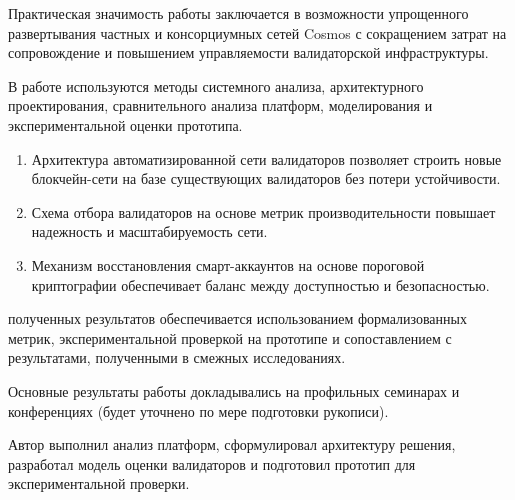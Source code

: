 {\influence} Практическая значимость работы заключается в возможности упрощенного
развертывания частных и консорциумных сетей Cosmos с сокращением затрат на
сопровождение и повышением управляемости валидаторской инфраструктуры.

{\methods} В работе используются методы системного анализа, архитектурного
проектирования, сравнительного анализа платформ, моделирования и экспериментальной
оценки прототипа.

{}
\begin{enumerate}[beginpenalty=10000]
  \item Архитектура автоматизированной сети валидаторов позволяет строить новые
  блокчейн-сети на базе существующих валидаторов без потери устойчивости.
  \item Схема отбора валидаторов на основе метрик производительности повышает
  надежность и масштабируемость сети.
  \item Механизм восстановления смарт-аккаунтов на основе пороговой криптографии
  обеспечивает баланс между доступностью и безопасностью.
\end{enumerate}

{\reliability} полученных результатов обеспечивается использованием формализованных
метрик, экспериментальной проверкой на прототипе и сопоставлением с результатами,
полученными в смежных исследованиях.

{\probation}
Основные результаты работы докладывались на профильных семинарах и конференциях
(будет уточнено по мере подготовки рукописи).

{\contribution} Автор выполнил анализ платформ, сформулировал архитектуру решения,
разработал модель оценки валидаторов и подготовил прототип для экспериментальной проверки.

